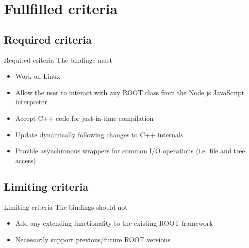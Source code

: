 \section{Fullfilled criteria}

\subsection{Required criteria}
\begin{frame}{Required criteria}
    The bindings must
     \begin{itemize}
		\item Work on Linux \uncover<2->{\checkmark}
        \item Allow the user to interact with any ROOT class from the Node.js JavaScript interpreter 
        \item Accept C++ code for just-in-time compilation 
        \item Update dynamically following changes to C++ internals 
        \item Provide asynchronous wrappers for common I/O operations (i.e. file and tree access) 
     \end{itemize}
\end{frame}


\subsection{Limiting criteria}
\begin{frame}{Limiting criteria}
    The bindings should not
    \begin{itemize}
        \item Add any extending functionality to the existing ROOT framework 
        \item Necessarily support previous/future ROOT versions 
    \end{itemize}
\end{frame}
